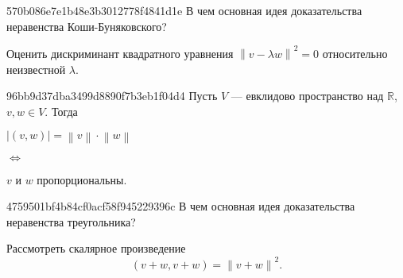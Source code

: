 \begin{note}{570b086e7e1b48e3b3012778f4841d1e}
    В чем основная идея доказательства неравенства Коши-Буняковского?

    \begin{cloze}{1}
        Оценить дискриминант квадратного уравнения \({ \left\lVert v - \lambda w \right\rVert^2 = 0 }\) относительно неизвестной \({ \lambda }\).
    \end{cloze}
\end{note}

\begin{note}{96bb9d37dba3499d8890f7b3eb1f04d4}
    Пусть \({ V }\) --- евклидово пространство над \({ \mathbb R }\),\: \({ v, w \in V }\).
    Тогда
    \begin{center}
        \({ \left\lvert (v, w) \right\rvert = \left\lVert v \right\rVert \cdot \left\lVert w \right\rVert }\)
        \begin{icloze}{2}\({ \iff }\)\end{icloze}
        \begin{icloze}{1}\({ v }\) и \({ w }\) пропорциональны.\end{icloze}
    \end{center}
\end{note}


\begin{note}{4759501bf4b84cf0acf58f945229396c}
    В чем основная идея доказательства неравенства треугольника?

    \begin{cloze}{1}
    Рассмотреть скалярное произведение
    \[
        (v + w, v + w) = \left\lVert v + w \right\rVert^2.
    \]
    \end{cloze}
\end{note}


